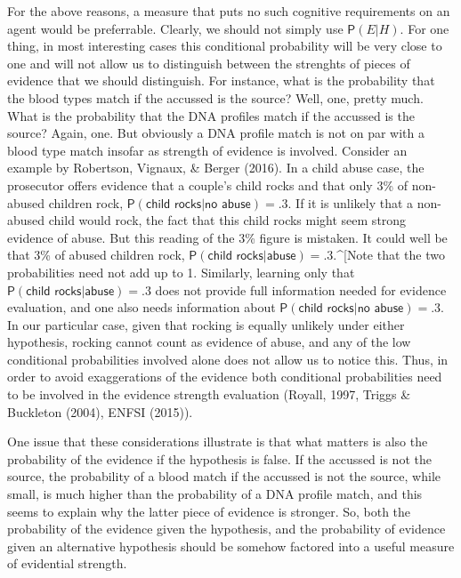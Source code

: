 \documentclass[10pt,dvipsnames,enabledeprecatedfontcommands]{scrartcl}
\newcommand{\pr}[1]{\mathsf{P}(#1)}
\begin{document}
For the above reasons, a measure that puts no such cognitive
requirements on an agent would be preferrable. Clearly, we should not
simply use \(\pr{E\vert H}\). For one thing, in most interesting cases
this conditional probability will be very close to one and will not
allow us to distinguish between the strenghts of pieces of evidence that
we should distinguish. For instance, what is the probability that the
blood types match if the accussed is the source? Well, one, pretty much.
What is the probability that the DNA profiles match if the accussed is
the source? Again, one. But obviously a DNA profile match is not on par
with a blood type match insofar as strength of evidence is involved.
Consider an example by Robertson, Vignaux, \& Berger (2016). In a child
abuse case, the prosecutor offers evidence that a couple's child rocks
and that only 3\% of non-abused children rock,
\(\pr{\textsf{child rocks} \vert \textsf{no abuse}}=.3\). If it is
unlikely that a non-abused child would rock, the fact that this child
rocks might seem strong evidence of abuse. But this reading of the 3\%
figure is mistaken. It could well be that 3\% of abused children rock,
\(\pr{\textsf{child rocks} \vert \textsf{abuse}}=.3\).\^{}{[}Note that
the two probabilities need not add up to 1. Similarly, learning only
that \(\pr{\textsf{child rocks} \vert \textsf{abuse}}=.3\) does not
provide full information needed for evidence evaluation, and one also
needs information about
\(\pr{\textsf{child rocks} \vert \textsf{no abuse}}=.3\). In our
particular case, given that rocking is equally unlikely under either
hypothesis, rocking cannot count as evidence of abuse, and any of the
low conditional probabilities involved alone does not allow us to notice
this. Thus, in order to avoid exaggerations of the evidence both
conditional probabilities need to be involved in the evidence strength
evaluation (Royall, 1997, Triggs \& Buckleton (2004), ENFSI (2015)).

One issue that these considerations illustrate is that what matters is
also the probability of the evidence if the hypothesis is false. If the
accussed is not the source, the probability of a blood match if the
accussed is not the source, while small, is much higher than the
probability of a DNA profile match, and this seems to explain why the
latter piece of evidence is stronger. So, both the probability of the
evidence given the hypothesis, and the probability of evidence given an
alternative hypothesis should be somehow factored into a useful measure
of evidential strength.
\end{document}
